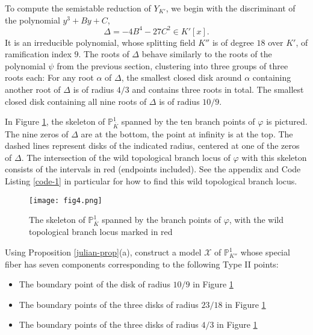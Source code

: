 \documentclass[11pt]{amsart}
\renewcommand{\phi}{\varphi}
\newcommand{\BP}{{\mathbb{P}}}
\newcommand{\CX}{{\mathcal X}}
\theoremstyle{definition}
\begin{document}
To compute the semistable reduction of $Y_{K'}$, we begin with the discriminant of the polynomial $y^3+By+C$, 
\begin{equation}\label{eq-discriminant}
\Delta=-4B^4-27C^2\in K'[x].
\end{equation}
It is an irreducible polynomial, whose splitting field $K''$ is of degree $18$ over $K'$, of ramification index $9$. The roots of $\Delta$ behave similarly to the roots of the polynomial $\psi$ from the previous section, clustering into three groups of three roots each: For any root $\alpha$ of $\Delta$, the smallest closed disk around $\alpha$ containing another root of $\Delta$ is of radius $4/3$ and contains three roots in total. The smallest closed disk containing all nine roots of $\Delta$ is of radius $10/9$.

In Figure \ref{fig-4}, the skeleton of $\BP^1_{\overline{K}}$ spanned by the ten branch points of $\phi$ is pictured. The nine zeros of $\Delta$ are at the bottom, the point at infinity is at the top. The dashed lines represent disks of the indicated radius, centered at one of the zeros of $\Delta$. The intersection of the wild topological branch locus of $\phi$ with this skeleton consists of the intervals in red (endpoints included). See the appendix and Code Listing \ref{code-1} in particular for how to find this wild topological branch locus.



\begin{figure}[!htb]
\centering
\texttt{[image: fig4.png]}
\caption{The skeleton of $\BP_{\overline{K}}^1$ spanned by the branch points of $\phi$, with the wild topological branch locus marked in red}
\label{fig-4}
\end{figure}

Using Proposition \ref{julian-prop}(a), construct a model $\CX$ of $\BP^1_{K''}$ whose special fiber has seven components corresponding to the following Type II points:
\begin{itemize}
\item The boundary point of the disk of radius $10/9$ in Figure \ref{fig-4}
\item The boundary points of the three disks of radius $23/18$ in Figure \ref{fig-4}
\item The boundary points of the three disks of radius $4/3$ in Figure \ref{fig-4}
\end{itemize}
\end{document}
